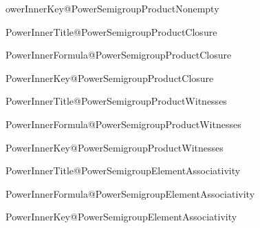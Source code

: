\expandafter\newcommand\csname PowerInnerKey@PowerSemigroupProductNonempty

\expandafter\newcommand\csname PowerInnerTitle@PowerSemigroupProductClosure

\expandafter\newcommand\csname PowerInnerFormula@PowerSemigroupProductClosure

\expandafter\newcommand\csname PowerInnerKey@PowerSemigroupProductClosure

\expandafter\newcommand\csname PowerInnerTitle@PowerSemigroupProductWitnesses

\expandafter\newcommand\csname PowerInnerFormula@PowerSemigroupProductWitnesses

\expandafter\newcommand\csname PowerInnerKey@PowerSemigroupProductWitnesses

\expandafter\newcommand\csname PowerInnerTitle@PowerSemigroupElementAssociativity

\expandafter\newcommand\csname PowerInnerFormula@PowerSemigroupElementAssociativity

\expandafter\newcommand\csname PowerInnerKey@PowerSemigroupElementAssociativity

